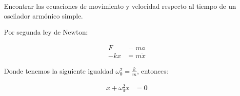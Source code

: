 
Encontrar las ecuaciones de movimiento y velocidad respecto al tiempo de un oscilador armónico simple.

\vspace*{0.3 cm}

Por segunda ley de Newton:

\begin{align*}
    F&=ma \\
    -kx&=m \ddot{x}
\end{align*}

Donde tenemos la siguiente igualdad $\omega_{0}^{2}=\frac{k}{m}$, entonces:

\begin{align*}
    \ddot{x} + \omega_{0}^{2} x &= 0
\end{align*}
